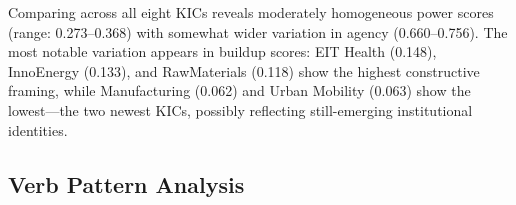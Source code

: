 \documentclass[../main.tex]{subfiles}
\begin{document}
Comparing across all eight KICs reveals moderately homogeneous power scores (range: 0.273--0.368) with somewhat wider variation in agency (0.660--0.756). The most notable variation appears in buildup scores: EIT Health (0.148), InnoEnergy (0.133), and RawMaterials (0.118) show the highest constructive framing, while Manufacturing (0.062) and Urban Mobility (0.063) show the lowest---the two newest KICs, possibly reflecting still-emerging institutional identities.

\subsection{Verb Pattern Analysis}
\end{document}
